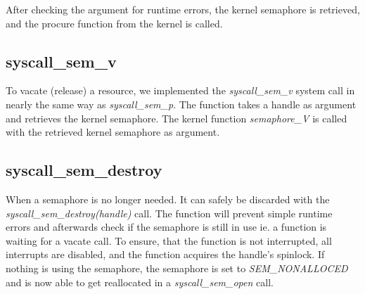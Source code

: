 \documentclass[11pt]{article}
\begin{document}
After checking the argument for runtime errors, the kernel semaphore is retrieved, and the procure function from the kernel is called.








\subsection{syscall\_sem\_v}
To vacate (release) a resource, we implemented the \emph{syscall\_sem\_v} system call in nearly the same way as \emph{syscall\_sem\_p}. The function takes a handle as argument and retrieves the kernel semaphore. The kernel function \emph{semaphore\_V} is called with the retrieved kernel semaphore as argument.








\subsection{syscall\_sem\_destroy}
When a semaphore is no longer needed. It can safely be discarded with the \emph{syscall\_sem\_destroy(handle)} call. The function will prevent simple runtime errors and afterwards check if the semaphore is still in use ie. a function is waiting for a vacate call. To ensure, that the function is not interrupted, all interrupts are disabled, and the function acquires the handle's spinlock. If nothing is using the semaphore, the semaphore is set to \emph{SEM\_NONALLOCED} and is now able to get reallocated in a \emph{syscall\_sem\_open} call.
\end{document}
